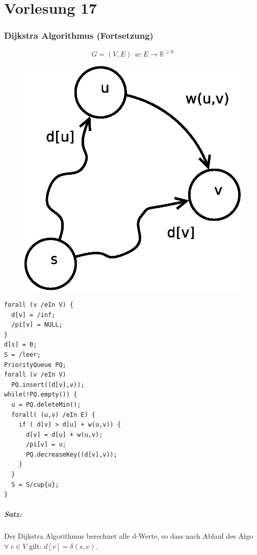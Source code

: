 \chapter{Vorlesung 17}
\subsection*{Dijkstra Algorithmus (Fortsetzung)}
\[ G=(V,E)~~ w:E\rightarrow \mathbb{R}^{\geq0} \]
\begin{figure}
	\centering
	\includegraphics[width=\linewidth]{17/Grafik/Skizze}
	\caption{}
	\label{fig:Skizze}
\end{figure}
\begin{lstlisting}
forall (v /eIn V) {
  d[v] = /inf;
  /pi[v] = NULL;
}
d[s] = 0;
S = /leer;
PriorityQueue PQ;
forall (v /eIn V)
  PQ.insert((d[v],v));
while(!PQ.empty()) {
  u = PQ.deleteMin();
  forall( (u,v) /eIn E) {
    if ( d[v] > d[u] + w(u,v)) {
      d[v] = d[u] + w(u,v);
      /pi[v] = u;
      PQ.decreaseKey((d[v],v));
    }
  }
  S = S/cup{u};
}
\end{lstlisting}

\paragraph{Satz:}
Der Dijkstra Algorithmus berechnet alle d-Werte, so dass nach Ablauf des Algo $\forall~v\in V$ gilt: $d[v] = \delta(s,v)$.
\pagebreak
